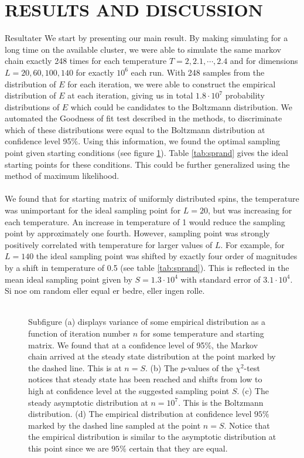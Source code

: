 \documentclass[11pt,english,a4paper]{article}
\begin{document}
\section*{\uppercase{Results and discussion}}
Resultater
We start by presenting our main result. By making simulating for a long time on the available cluster, we were able to simulate the same markov chain exactly 248 times for each temperature $T = 2,2.1,\cdots,2.4$ and for dimensions $L=20,60,100,140$ for exactly $10^6$ each run. With 248 samples from the distribution of $E$ for each iteration, we were able to construct the empirical distribution of $E$ at each iteration, giving us in total $1.8\cdot 10^7$ probability distributions of $E$ which could be candidates to the Boltzmann distribution. We automated the Goodness of fit test described in the methods, to discriminate which of these distributions were equal to the Boltzmann distribution at confidence level 95\%. Using this information, we found the optimal sampling point given starting conditions (see figure \ref{fig:sampl}). Table \ref{tab:sprand} gives the ideal starting points for these conditions. This could be further generalized using the method of maximum likelihood. \\
\\
We found that for starting matrix of uniformly distributed spins, the temperature was unimportant for the ideal sampling point for $L=20$, but was increasing for each temperature. An increase in temperature of 1 would reduce the sampling point by approximately one fourth. However, sampling point was strongly positively correlated with temperature for larger values of $L$. For example, for $L=140$ the ideal sampling point was shifted by exactly four order of magnitudes by a shift in temperature of 0.5 (see table \ref{tab:sprand}). This is reflected in the mean ideal sampling point given by $S = 1.3\cdot 10^4$ with standard error of $3.1\cdot 10^4$. Si noe om random eller equal er bedre, eller ingen rolle.\\
\\
\begin{figure}[!h]
\center

\caption{Subfigure (a) displays variance of some empirical distribution as a function of iteration number $n$ for some temperature and starting matrix. We found that at a confidence level of 95\%, the Markov chain arrived at the steady state distribution at the point marked by the dashed line. This is at $n = S$. (b) The $p$-values of the $\chi^2$-test notices that steady state has been reached and shifts from low to high at confidence level at the suggested sampling point $S$. (c) The steady asymptotic distribution at $n = 10^7$. This is the Boltzmann distribution. (d) The empirical distribution at confidence level $95\%$ marked by the dashed line sampled at the point $n=S$. Notice that the empirical distribution is similar to the asymptotic distribution at this point since we are $95\%$ certain that they are equal.}\label{fig:sampl}
\end{figure}
\end{document}
